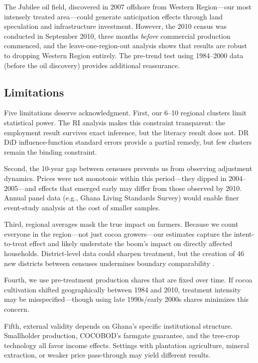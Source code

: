 \documentclass[12pt]{article}
\begin{document}
The Jubilee oil field, discovered in 2007 offshore from Western Region---our most intensely treated area---could generate anticipation effects through land speculation and infrastructure investment. However, the 2010 census was conducted in September 2010, three months \textit{before} commercial production commenced, and the leave-one-region-out analysis shows that results are robust to dropping Western Region entirely. The pre-trend test using 1984--2000 data (before the oil discovery) provides additional reassurance.

\subsection{Limitations}

Five limitations deserve acknowledgment. First, our 6--10 regional clusters limit statistical power. The RI analysis makes this constraint transparent: the employment result survives exact inference, but the literacy result does not. DR DiD influence-function standard errors provide a partial remedy, but few clusters remain the binding constraint.

Second, the 10-year gap between censuses prevents us from observing adjustment dynamics. Prices were not monotonic within this period---they dipped in 2004--2005---and effects that emerged early may differ from those observed by 2010. Annual panel data (e.g., Ghana Living Standards Survey) would enable finer event-study analysis at the cost of smaller samples.

Third, regional averages mask the true impact on farmers. Because we count everyone in the region---not just cocoa growers---our estimates capture the intent-to-treat effect and likely understate the boom's impact on directly affected households. District-level data could sharpen treatment, but the creation of 46 new districts between censuses undermines boundary comparability \citep{jedwab2016}.

Fourth, we use pre-treatment production shares that are fixed over time. If cocoa cultivation shifted geographically between 1984 and 2010, treatment intensity may be misspecified---though using late 1990s/early 2000s shares minimizes this concern.

Fifth, external validity depends on Ghana's specific institutional structure. Smallholder production, COCOBOD's farmgate guarantee, and the tree-crop technology all favor income effects. Settings with plantation agriculture, mineral extraction, or weaker price pass-through may yield different results.
\end{document}
